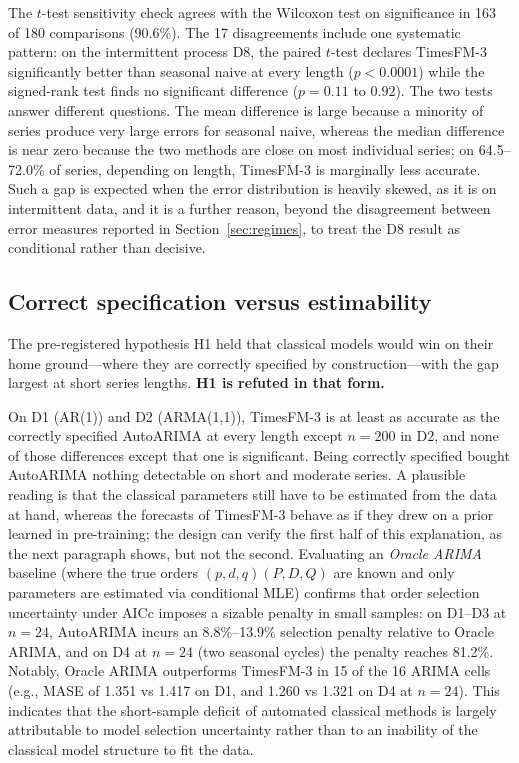 \documentclass[11pt]{article}
\providecommand{\sectionref}[1]{Section~\ref{#1}}
\begin{document}
The $t$-test sensitivity check agrees with the Wilcoxon test on significance in 163 of 180
comparisons (90.6\%). The 17 disagreements include one systematic pattern: on the intermittent process D8, the paired $t$-test declares TimesFM-3 significantly
better than seasonal naive at every length ($p < 0.0001$) while the signed-rank test finds no
significant difference ($p = 0.11$ to $0.92$). The two tests answer different questions. The mean difference is large because a minority of
series produce very large errors for seasonal naive, whereas the median difference is near zero
because the two methods are close on most individual series; on 64.5--72.0\% of series, depending on
length, TimesFM-3 is marginally less accurate. Such a gap is expected when the error distribution
is heavily skewed, as it is on intermittent data, and it is a further reason, beyond the
disagreement between error measures reported in \sectionref{sec:regimes}, to treat the D8 result
as conditional rather than decisive.

\subsection{Correct specification versus estimability}
\label{sec:estimability}

The pre-registered hypothesis H1 held that classical models would win on their home
ground---where they are correctly specified by construction---with the gap largest at short
series lengths. \textbf{H1 is refuted in that form.}

On D1 (AR(1)) and D2 (ARMA(1,1)), TimesFM-3 is at least as accurate as the correctly specified
AutoARIMA at every length except $n = 200$ in D2, and none of those differences except that one
is significant. Being correctly specified bought AutoARIMA nothing detectable on short and
moderate series. A plausible reading is that the classical parameters still have to be estimated
from the data at hand, whereas the forecasts of TimesFM-3 behave as if they drew on a prior
learned in pre-training; the design can verify the first half of this explanation, as the next
paragraph shows, but not the second.
Evaluating an \emph{Oracle ARIMA} baseline (where the true orders $(p,d,q)(P,D,Q)$ are known
and only parameters are estimated via conditional MLE) confirms that order selection uncertainty
under AICc imposes a sizable penalty in small samples: on D1--D3 at $n = 24$, AutoARIMA incurs an
8.8\%--13.9\% selection penalty relative to Oracle ARIMA, and on D4 at $n = 24$ (two seasonal cycles)
the penalty reaches 81.2\%. Notably, Oracle ARIMA outperforms TimesFM-3 in 15 of the 16 ARIMA cells
(e.g., MASE of 1.351 vs 1.417 on D1, and 1.260 vs 1.321 on D4 at $n = 24$). This indicates that
the short-sample deficit of automated classical methods is largely attributable to model
selection uncertainty rather than to an inability of the classical model structure to fit the
data.
\end{document}
